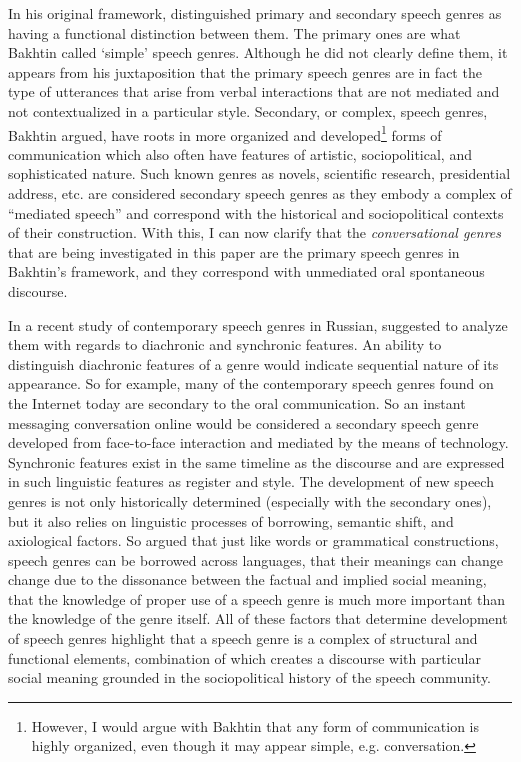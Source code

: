 \documentclass[12pt, draft]{article}
\begin{document}
In his original framework, \textcite{bakhtin1986} distinguished primary and secondary speech genres as having a functional distinction between them. The primary ones are what Bakhtin called `simple' speech genres. Although he did not clearly define them, it appears from his juxtaposition that the primary speech genres are in fact the type of utterances that arise from verbal interactions that are not mediated and not contextualized in a particular style. Secondary, or complex, speech genres, Bakhtin argued, have roots in more organized and developed\footnote{However, I would argue with Bakhtin that any form of communication is highly organized, even though it may appear simple, e.g. conversation.} forms of communication which also often have features of artistic, sociopolitical, and sophisticated nature. Such known genres as novels, scientific research, presidential address, etc. are considered secondary speech genres as they embody a complex of ``mediated speech'' and correspond with the historical and sociopolitical contexts of their construction. With this, I can now clarify that the \textit{conversational genres} that are being investigated in this paper are the primary speech genres in Bakhtin's framework, and they correspond with unmediated oral spontaneous discourse.

In a recent study of contemporary speech genres in Russian, \textcite{dementyev2015} suggested to analyze them with regards to diachronic and synchronic features. An ability to distinguish diachronic features of a genre would indicate sequential nature of its appearance. So for example, many of the contemporary speech genres found on the Internet today are secondary to the oral communication. So an instant messaging conversation online would be considered a secondary speech genre developed from face-to-face interaction and mediated by the means of technology. Synchronic features exist in the same timeline as the discourse and are expressed in such linguistic features as register and style. The development of new speech genres is not only historically determined (especially with the secondary ones), but it also relies on linguistic processes of borrowing, semantic shift, and axiological factors. So \textcite[p. 81-82]{dementyev2015} argued that just like words or grammatical constructions, speech genres can be borrowed across languages, that their meanings can change change due to the dissonance between the factual and implied social meaning, that the knowledge of proper use of a speech genre is much more important than the knowledge of the genre itself. All of these factors that determine development of speech genres highlight that a speech genre is a complex of structural and functional elements, combination of which creates a discourse with particular social meaning grounded in the sociopolitical history of the speech community. 
\end{document}
